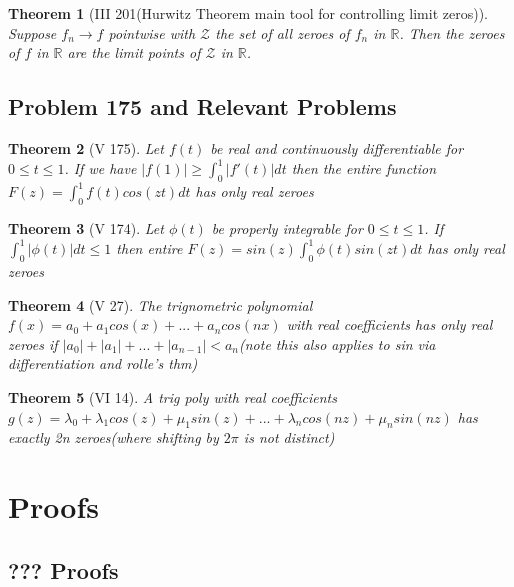 \documentclass[10pt]{article}
\newcommand{\1}{\textbf{1}}
\newcommand{\R}{\mathbb{R}}
\newtheorem{theorem}{Theorem}
\theoremstyle{remark}
\theoremstyle{definition}
\begin{document}
\begin{theorem}[III 201(Hurwitz Theorem main tool for controlling limit zeros)]
	Suppose $f_n \to f$ pointwise with $\mathcal{Z}$ the set of all zeroes of $f_n$ in $\R$. Then the zeroes of $f$ in $\R$ are the limit points of $\mathcal{Z}$ in $\R$.
\end{theorem}

\subsection{Problem 175 and Relevant Problems}

\begin{theorem}[V 175] \label{175}
	Let $f(t)$ be real and continuously differentiable for $0 \leq t \leq 1$. If we have $|f(1)| \geq \int_0^1 |f'(t)| dt$ then the entire function $F(z) = \int_0^1 f(t)cos(zt)dt$ has only real zeroes
\end{theorem}

\begin{theorem}[V 174]
	Let $\phi(t)$ be properly integrable for $0 \leq t \leq 1$. If $\int_0^1 |\phi(t)| dt \leq 1$ then entire $F(z)=sin(z) \int_0^1 \phi(t) sin(zt)dt$ has only real zeroes
\end{theorem}

\begin{theorem}[V 27]
	The trignometric polynomial $f(x) = a_0 + a_1 cos(x) + ... + a_ncos(nx)$ with real coefficients has only real zeroes if $|a_0| + |a_1| + ... + |a_{n-1}| < a_n$(note this also applies to sin via differentiation and rolle's thm)
\end{theorem}

\begin{theorem}[VI 14]
	A trig poly with real coefficients $g(z) = \lambda_0 + \lambda_1 cos(z) +\mu_1sin(z) + ... + \lambda_n cos(nz)+\mu_n sin(nz)$ has exactly 2n zeroes(where shifting by $2\pi$ is not distinct)
\end{theorem}




\section{Proofs}

\subsection{??? Proofs}
\end{document}
